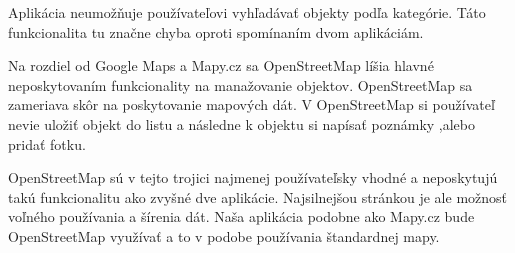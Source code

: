 Aplikácia neumožňuje používateľovi vyhľadávať objekty podľa kategórie.
Táto funkcionalita tu značne chyba oproti spomínaním dvom aplikáciám. 

Na rozdiel od Google Maps a Mapy.cz sa OpenStreetMap líšia hlavné  neposkytovaním funkcionality na 
manažovanie objektov. OpenStreetMap sa zameriava skôr na poskytovanie mapových dát. 
V OpenStreetMap si používateľ nevie uložiť objekt do listu a následne k objektu si napísať poznámky ,alebo 
pridať fotku. 

OpenStreetMap sú v tejto trojici najmenej používateľsky vhodné a neposkytujú
takú funkcionalitu ako zvyšné dve aplikácie.
Najsilnejšou stránkou je ale možnosť voľného používania a  šírenia dát.
Naša aplikácia podobne ako Mapy.cz bude OpenStreetMap využívať a to v podobe 
používania štandardnej mapy. 


